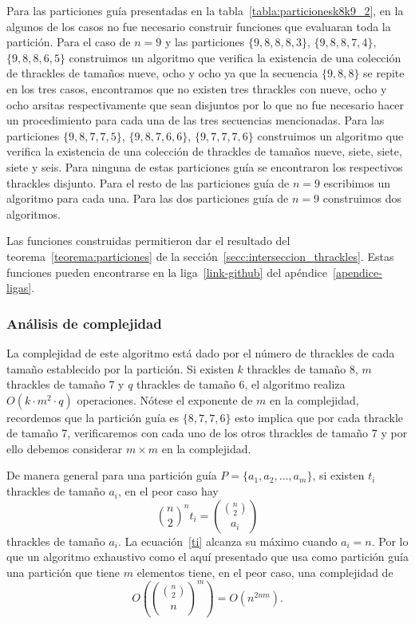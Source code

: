  Para las particiones guía presentadas en la tabla~\ref{tabla:particionesk8k9_2}, en la
  algunos de los casos no fue necesario construir funciones que evaluaran toda la
  partición. Para el caso de $n=9$ y las particiones $\{9,8,8,8,3\}$, $\{9,8,8,7,4\}$, $\{9,8,8,6,5\}$
  construimos un algoritmo que verifica la existencia de una colección de thrackles de tamaños
  nueve, ocho y ocho ya que la secuencia $\{9,8,8\}$ se repite en los tres casos, encontramos que no existen tres thrackles con nueve, ocho y ocho arsitas respectivamente que sean disjuntos por lo que no fue necesario hacer un procedimiento para cada una de las tres secuencias mencionadas. Para las particiones $\{9,8,7,7,5\}$, $\{9,8,7,6,6\}$, $\{9,7,7,7,6\}$ construimos
  un algoritmo que verifica la existencia de una colección de thrackles de tamaños nueve, siete,
  siete, siete y seis. Para ninguna de estas particiones guía se encontraron los respectivos thrackles disjunto. Para el resto de las particiones guía de $n=9$ escribimos un algoritmo para
  cada una. Para las dos particiones guía de $n=9$ construimos dos algoritmos.

  Las funciones construidas permitieron dar el resultado del
  teorema~\ref{teorema:particiones} de la sección~\ref{secc:interseccion_thrackles}.
  Estas funciones pueden encontrarse en la liga~\ref{link-github} del apéndice~\ref{apendice-ligas}.

  \subsubsection{Análisis de complejidad}
  La complejidad de este algoritmo está dado por el número de thrackles de cada
  tamaño establecido por la partición. Si existen $k$ thrackles de tamaño 8, $m$
  thrackles de tamaño 7 y $q$ thrackles de tamaño 6, el algoritmo realiza $O(k\cdot
  m^2 \cdot q)$ operaciones. Nótese el exponente de $m$ en la complejidad, recordemos que
  la partición guía es $\{8,7,7,6\}$ esto implica que por cada thrackle de tamaño 7, verificaremos
  con cada uno de los otros thrackles de tamaño 7 y por ello debemos considerar $m\times m$ en la
  complejidad.

  De manera general para una partición guía $P=\{a_1,a_2,\dots,a_m\}$, si existen $t_i$
  thrackles de tamaño $a_i$, en el peor caso hay
  \begin{equation} \label{ti}
    \binom{n}{2}^n t_i=\displaystyle \binom{\binom{n}{2}}{a_i}
  \end{equation}
  thrackles de tamaño $a_i$. La ecuación~\ref{ti} alcanza su máximo cuando $a_i=n$. Por lo que
  un algoritmo exhaustivo como el aquí presentado que usa como partición guía una partición que tiene
  $m$ elementos tiene, en el peor caso, una complejidad de
  \[O\left(\binom{\binom{n}{2}}{n}^m\right) = O(n^{2nm}). \]

